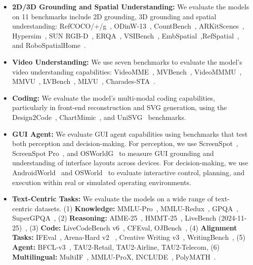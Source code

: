 \begin{itemize}[itemindent=0pt, labelsep=4pt, leftmargin=*]
\item \textbf{2D/3D Grounding and Spatial Understanding:} We evaluate the models on 11 benchmarks include 2D grounding, 3D grounding and spatial understanding: RefCOCO/+/g~\citep{refcoco, refcocog}, ODinW-13~\citep{li2022grounded}, CountBench~\citep{paiss2023teaching}, ARKitScenes~\citep{baruch2021arkitscenes}, Hypersim~\citep{roberts2021hypersim}, SUN RGB-D~\citep{song2015sun}, ERQA~\citep{team2025gemini}, VSIBench~\citep{yang2025thinking}, EmbSpatial~\citep{du2024embspatial},RefSpatial~\citep{zhou2025roborefer}, and RoboSpatialHome~\citep{song2025robospatial}.
\item \textbf{Video Understanding:} We use seven benchmarks to evaluate the model's video understanding capabilities: VideoMME~\citep{fu2024video}, MVBench~\citep{li2024mvbench}, VideoMMMU~\citep{hu2025video}, MMVU~\citep{zhao2025mmvu}, LVBench~\citep{wang2024lvbench}, MLVU~\citep{zhou2024mlvu}, Charades-STA~\citep{gao2017tall}.

\item \textbf{Coding:} We evaluate the model's multi-modal coding capabilities, particularly in front-end reconstruction and SVG generation, using the Design2Code~\citep{si2025design2code}, ChartMimic~\citep{yang2024chartmimic}, and UniSVG~\citep{li2025unisvg} benchmarks.

\item \textbf{GUI Agent:} We evaluate GUI agent capabilities using benchmarks that test both perception and decision-making. For perception, we use ScreenSpot~\citep{cheng2024seeclick}, ScreenSpot Pro~\citep{screenspotpro}, and OSWorldG~\citep{xie2025scalingcomputerusegroundinguser} to measure GUI grounding and understanding of interface layouts across devices. For decision-making, we use AndroidWorld~\citep{rawles2024androidworld} and OSWorld~\citep{xie2025osworld,osworld_verified} to evaluate interactive control, planning, and execution within real or simulated operating environments.

\item \textbf{Text-Centric Tasks:} We evaluate the models on a wide range of text-centric datasets. (1) \textbf{Knowledge:} MMLU-Pro~\citep{mmlupro}, MMLU-Redux~\citep{DBLP:journals/corr/abs-2406-04127}, GPQA~\citep{DBLP:journals/corr/abs-2311-12022}, SuperGPQA~\citep{DBLP:journals/corr/abs-2502-14739}, (2) \textbf{Reasoning:} AIME-25~\citep{aime25}, HMMT-25~\citep{hmmt25}, LiveBench (2024-11-25)~\citep{DBLP:journals/corr/abs-2406-19314}, (3) \textbf{Code:} LiveCodeBench v6~\citep{DBLP:journals/corr/abs-2403-07974}, CFEval, OJBench~\citep{DBLP:journals/corr/abs-2506-16395}, (4) \textbf{Alignment Tasks:} IFEval~\citep{DBLP:journals/corr/abs-2311-07911}, Arena-Hard v2~\citep{DBLP:journals/corr/abs-2406-11939} , Creative Writing v3~\citep{DBLP:journals/corr/abs-2312-06281}, WritingBench~\citep{DBLP:journals/corr/abs-2503-05244}, (5) \textbf{Agent:} BFCL-v3~\citep{patil2025bfcl}, TAU2-Retail, TAU2-Airline, TAU2-Telecom, (6) \textbf{Multilingual:} MultiIF~\citep{DBLP:journals/corr/abs-2410-15553}, MMLU-ProX, INCLUDE~\citep{DBLP:conf/iclr/RomanouFSNSMACH25}, PolyMATH~\citep{DBLP:journals/corr/abs-2504-18428}.

\end{itemize}

\clearpage

